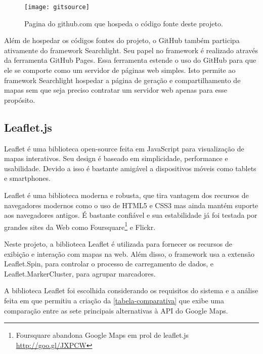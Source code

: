 	\begin{figure}[htb]
	\caption{\label{fig-gitsource}Pagina do github.com que hospeda o código fonte deste projeto.}
	\begin{center}
	    \texttt{[image: gitsource]}
	\end{center}
\end{figure}

Além de hospedar os códigos fontes do projeto, o GitHub também participa ativamente do framework Searchlight. Seu papel no framework é realizado através da ferramenta GitHub Pages. Essa ferramenta estende o uso do GitHub para que ele se comporte como um servidor de páginas web simples. Isto permite ao framework Searchlight hospedar a página de geração e compartilhamento de mapas sem que seja preciso contratar um servidor web apenas para esse propósito.


\subsection{Leaflet.js}

Leaflet é uma biblioteca open-source feita em JavaScript para visualização de mapas interativos. Seu design é baseado em simplicidade, performance e usabilidade. Devido a isso é bastante amigável a dispositivos móveis como tablets e smartphones.

Leaflet é uma biblioteca moderna e robusta, que tira vantagem dos recursos de navegadores modernos como o uso de HTML5  e CSS3 mas ainda mantém suporte aos navegadores antigos.  É bastante confiável e sua estabilidade já foi testada por grandes sites da Web como Foursquare\footnote{Foursquare abandona Google Maps em prol de leaflet.js \url{http://goo.gl/JXPCW}} e Flickr.

Neste projeto, a biblioteca Leaflet é utilizada para fornecer os recursos de exibição e interação com mapas na web.  Além disso, o framework usa a extensão  Leaflet.Spin, para controlar o processo de carregamento de dados, e Leaflet.MarkerCluster, para agrupar marcadores. 

A biblioteca Leaflet foi escolhida considerando os requisitos do sistema e a análise feita em \cite{gmapalternatives} que permitiu a criação da \autoref{tabela-comparativa} que exibe uma comparação entre as sete principais alternativas à  API do Google Maps.


